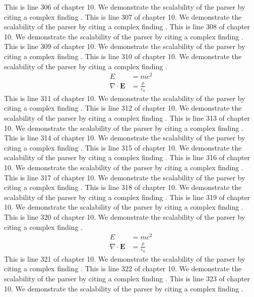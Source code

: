 This is line 306 of chapter 10. We demonstrate the scalability of the parser by citing a complex finding \cite{ref10_306}.
This is line 307 of chapter 10. We demonstrate the scalability of the parser by citing a complex finding \cite{ref10_307}.
This is line 308 of chapter 10. We demonstrate the scalability of the parser by citing a complex finding \cite{ref10_308}.
This is line 309 of chapter 10. We demonstrate the scalability of the parser by citing a complex finding \cite{ref10_309}.
This is line 310 of chapter 10. We demonstrate the scalability of the parser by citing a complex finding \cite{ref10_310}.
\begin{align*}
  E &= mc^2 \\
  \nabla \cdot \mathbf{E} &= \frac{\rho}{\varepsilon_0}
\end{align*}
This is line 311 of chapter 10. We demonstrate the scalability of the parser by citing a complex finding \cite{ref10_311}.
This is line 312 of chapter 10. We demonstrate the scalability of the parser by citing a complex finding \cite{ref10_312}.
This is line 313 of chapter 10. We demonstrate the scalability of the parser by citing a complex finding \cite{ref10_313}.
This is line 314 of chapter 10. We demonstrate the scalability of the parser by citing a complex finding \cite{ref10_314}.
This is line 315 of chapter 10. We demonstrate the scalability of the parser by citing a complex finding \cite{ref10_315}.
This is line 316 of chapter 10. We demonstrate the scalability of the parser by citing a complex finding \cite{ref10_316}.
This is line 317 of chapter 10. We demonstrate the scalability of the parser by citing a complex finding \cite{ref10_317}.
This is line 318 of chapter 10. We demonstrate the scalability of the parser by citing a complex finding \cite{ref10_318}.
This is line 319 of chapter 10. We demonstrate the scalability of the parser by citing a complex finding \cite{ref10_319}.
This is line 320 of chapter 10. We demonstrate the scalability of the parser by citing a complex finding \cite{ref10_320}.
\begin{align*}
  E &= mc^2 \\
  \nabla \cdot \mathbf{E} &= \frac{\rho}{\varepsilon_0}
\end{align*}
This is line 321 of chapter 10. We demonstrate the scalability of the parser by citing a complex finding \cite{ref10_321}.
This is line 322 of chapter 10. We demonstrate the scalability of the parser by citing a complex finding \cite{ref10_322}.
This is line 323 of chapter 10. We demonstrate the scalability of the parser by citing a complex finding \cite{ref10_323}.
